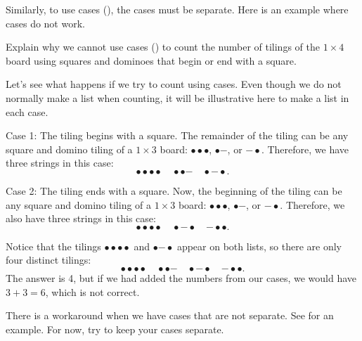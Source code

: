 Similarly, to use cases (), the cases must be separate.  Here is an example where cases do not work.

\begin{exam} 
\label{exam_not_cases}
    Explain why we cannot use cases () to count the number of tilings of the $1 \times 4$ board using squares and dominoes that begin or end with a square.
    \begin{soln}
        Let's see what happens if we try to count using cases. Even though we do not normally make a list when counting, it will be illustrative here to make a list in each case.

        Case 1: The tiling begins with a square. The remainder of the tiling can be any square and domino tiling of a $1 \times 3$ board:            $\bullet\bullet\bullet$,     
            $\bullet\boldsymbol{-}$, or 
            $\boldsymbol{-}\bullet$.  
        Therefore, we have three strings in this case: 
            $$\bullet\bullet\bullet\bullet \quad     
            \bullet\bullet\boldsymbol{-} \quad
            \bullet\boldsymbol{-}\bullet.$$ 

        Case 2: The tiling ends with a square. Now, the beginning of the tiling can be any square and domino tiling of a $1 \times 3$ board:        $\bullet\bullet\bullet$,     
            $\bullet\boldsymbol{-}$, or 
            $\boldsymbol{-}\bullet$.
        Therefore, we also have three strings in this case: 
            $$\bullet\bullet\bullet\bullet \quad     
            \bullet\boldsymbol{-}\bullet \quad
            \boldsymbol{-}\bullet\bullet.$$

        Notice that the tilings     
            $\bullet\bullet\bullet\bullet$
        and 
            $\bullet\boldsymbol{-}\bullet$
        appear on both lists, so there are only four distinct tilings:
            $$\bullet\bullet\bullet\bullet \quad     
            \bullet\bullet\boldsymbol{-}\quad
            \bullet\boldsymbol{-}\bullet\quad
            \boldsymbol{-}\bullet\bullet.$$
        The answer is 4, but if we had added the numbers from our cases, we would have $3+3=6$, which is not correct.
    \end{soln}
\end{exam}

There is a workaround when we have cases that are not separate.  See %
 for an example.  For now, try to keep your cases separate.

